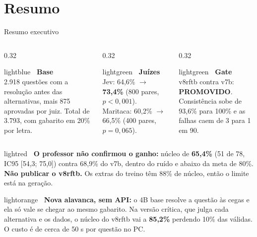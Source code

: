 \documentclass[aspectratio=169,11pt]{beamer}
\begin{document}
\section{Resumo}
\begin{frame}{Resumo executivo}
  \begin{columns}[T]
    \begin{column}{0.32\textwidth}
      \begin{caixa}{lightblue}
        \textbf{\faDatabase\ Base}\\[2pt]
        2.918 questões com a resolução antes das alternativas, mais 875 aprovadas por juiz.
        Total de 3.793, com gabarito em 20\% por letra.
      \end{caixa}
    \end{column}
    \begin{column}{0.32\textwidth}
      \begin{caixa}{lightgreen}
        \textbf{\faBalanceScale\ Juízes}\\[2pt]
        Jev: 64,6\% $\rightarrow$ \textbf{73,4\%} (800 pares, $p<0{,}001$).
        Maritaca: 60,2\% $\rightarrow$ 66,5\% (400 pares, $p=0{,}065$).
      \end{caixa}
    \end{column}
    \begin{column}{0.32\textwidth}
      \begin{caixa}{lightgreen}
        \textbf{\faCheckCircle\ Gate}\\[2pt]
        v8rftb contra v7b: \textbf{PROMOVIDO}. Consistência sobe de 93,6\% para 100\% e as
        falhas caem de 3 para 1 em 90.
      \end{caixa}
    \end{column}
  \end{columns}
  \vspace{2pt}
  \begin{caixa}[fontupper=\footnotesize, before skip=3pt, after skip=3pt]{lightred}
    \textbf{\faExclamationTriangle\ O professor não confirmou o ganho:} núcleo de \textbf{65,4\%} (51 de 78, IC95 [54,3; 75,0])
    contra 68,9\% do v7b, dentro do ruído e abaixo da meta de 80\%. \textbf{Não publicar o v8rftb.}
    Os extras do treino têm 88\% de núcleo, então o limite está na geração.
  \end{caixa}
  \vspace{2pt}
  \begin{caixa}[fontupper=\footnotesize, before skip=3pt, after skip=0pt]{lightorange}
    \textbf{\faRedo\ Nova alavanca, sem API:} o 4B base resolve a questão às cegas e ela só vale se chegar ao mesmo gabarito.
    Na versão crítica, que julga cada alternativa e os dados, o núcleo do v8rftb vai a \textbf{85,2\%} perdendo 10\% das válidas. O custo é de cerca de 50 s por questão no PC.
  \end{caixa}
\end{frame}
\end{document}
